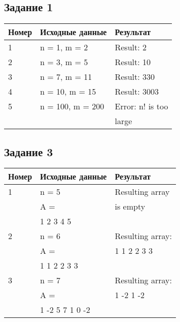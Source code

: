 \begin{minipage}[t]{0.5\textwidth}
\subsection*{\centering Задание 1}
\begin{tabular}{|l|l|l|}
    \hline
    Номер & Исходные данные & Результат\\[2ex]
    \hline
    1 & n = 1, m = 2 & Result: 2\\[2ex]
    \hline
    2 & n = 3, m = 5 & Result: 10\\[2ex]
    \hline
    3 & n = 7, m = 11 & Result: 330\\[2ex]
    \hline
    4 & n = 10, m = 15 & Result: 3003\\[2ex]
    \hline
    5 & n = 100, m = 200 & Error: n! is too\\
    && large\\
    \hline
\end{tabular}

\subsection*{\centering Задание 3}
\begin{tabular}{|l|l|l|}
  \hline
  Номер & Исходные данные & Результат\\[2ex]
  \hline  
  1 & n = 5               & Resulting array\\
    & A =                 & is empty\\
    & 1 2 3 4 5           & \\
  \hline
  2 & n = 6               & Resulting array: \\
    & A =                 & 1 1 2 2 3 3 \\
    & 1 1 2 2 3 3         & \\
  \hline
  3 & n = 7               & Resulting array: \\
    & A =                 & 1 -2 1 -2 \\
    & 1 -2 5 7 1 0 -2     & \\
  \hline
\end{tabular}
\end{minipage}%
\hfil
